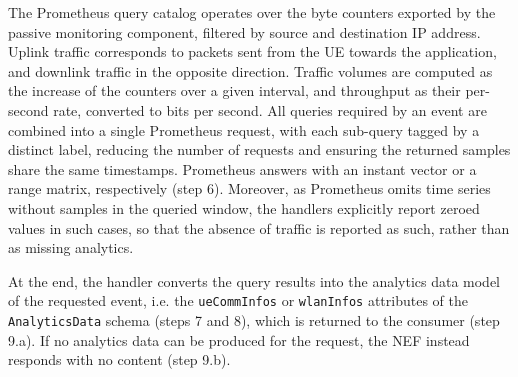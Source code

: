 The Prometheus query catalog operates over the byte counters exported by the passive monitoring component, filtered by source and destination \acs{IP} address. Uplink traffic corresponds to packets sent from the \acs{UE} towards the application, and downlink traffic in the opposite direction. Traffic volumes are computed as the increase of the counters over a given interval, and throughput as their per-second rate, converted to bits per second. All queries required by an event are combined into a single Prometheus request, with each sub-query tagged by a distinct label, reducing the number of requests and ensuring the returned samples share the same timestamps. Prometheus answers with an instant vector or a range matrix, respectively (step 6). Moreover, as Prometheus omits time series without samples in the queried window, the handlers explicitly report zeroed values in such cases, so that the absence of traffic is reported as such, rather than as missing analytics.

At the end, the handler converts the query results into the analytics data model of the requested event, i.e. the \texttt{ueCommInfos} or \texttt{wlanInfos} attributes of the \texttt{AnalyticsData} schema (steps 7 and 8), which is returned to the consumer (step 9.a). If no analytics data can be produced for the request, the \acs{NEF} instead responds with no content (step 9.b).
